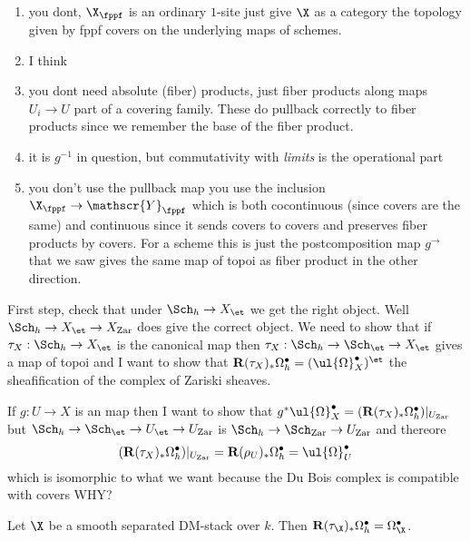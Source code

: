 \documentclass[12pt]{article}
\newcommand{\Y}{\mathscr{Y}}
\begin{document}
\begin{enumerate}
\item you dont, $\X_{\fppf}$ is an ordinary $1$-site just give $\X$ as a category the topology given by fppf covers on the underlying maps of schemes.

\item I think 

\item you dont need absolute (fiber) products, just fiber products along maps $U_i \to U$ part of a covering family. These do pullback correctly to fiber products since we remember the base of the fiber product.  

\item it is $g^{-1}$ in question, but commutativity with \textit{limits} is the operational part

\item you don't use the pullback map you use the inclusion $\X_{\fppf} \to \Y_{\fppf}$ which is both cocontinuous (since covers are the same) and continuous since it sends covers to covers and preserves fiber products by covers. For a scheme this is just the postcomposition map $g^{\to}$ that we saw gives the same map of topoi as fiber product in the other direction.
\end{enumerate}

First step, check that under $\Sch_h \to X_{\et}$ we get the right object. Well $\Sch_h \to X_{\et} \to X_{\Zar}$ does give the correct object. We need to show that if $\tau_X : \Sch_h \to X_{\et}$ is the canonical map then $\tau_X : \Sch_h \to \Sch_{\et} \to X_{\et}$ gives a map of topoi and I want to show that $\R (\tau_X)_* \Omega_h^\bullet = (\ul{\Omega}_X^\bullet)^{\et}$ the sheafification of the complex of Zariski sheaves.

If $g : U \to X$ is an \etale map then I want to show that $g^* \ul{\Omega}_X^\bullet = (\R (\tau_X)_* \Omega_h^\bullet)|_{U_{\Zar}}$ but $\Sch_h \to \Sch_\et \to U_{\et} \to U_{\Zar}$ is $\Sch_h \to \Sch_{\Zar} \to U_{\Zar}$ and thereore 
\[ (\R (\tau_X)_* \Omega_h^\bullet)|_{U_{\Zar}} = \R (\rho_U)_* \Omega_h^\bullet = \ul{\Omega}_U^\bullet \]
which is isomorphic to what we want because the Du Bois complex is compatible with \etale covers {\color{red} WHY?}

\begin{prop}
Let $\X$ be a smooth separated DM-stack over $k$. Then $\R (\tau_{\X})_* \Omega^\bullet_h = \Omega^\bullet_{\X}$.
\end{prop}
\end{document}
